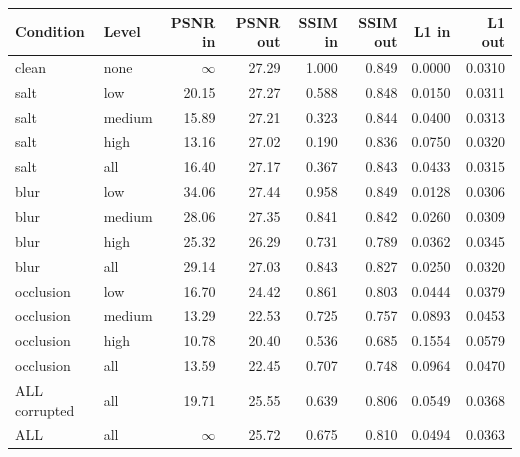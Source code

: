 \begin{tabular}{llrrrrrr}
\hline
Condition & Level & PSNR in & PSNR out & SSIM in & SSIM out & L1 in & L1 out \\
\hline
clean & none & $\infty$ & 27.29 & 1.000 & 0.849 & 0.0000 & 0.0310 \\
salt & low & 20.15 & 27.27 & 0.588 & 0.848 & 0.0150 & 0.0311 \\
salt & medium & 15.89 & 27.21 & 0.323 & 0.844 & 0.0400 & 0.0313 \\
salt & high & 13.16 & 27.02 & 0.190 & 0.836 & 0.0750 & 0.0320 \\
salt & all & 16.40 & 27.17 & 0.367 & 0.843 & 0.0433 & 0.0315 \\
blur & low & 34.06 & 27.44 & 0.958 & 0.849 & 0.0128 & 0.0306 \\
blur & medium & 28.06 & 27.35 & 0.841 & 0.842 & 0.0260 & 0.0309 \\
blur & high & 25.32 & 26.29 & 0.731 & 0.789 & 0.0362 & 0.0345 \\
blur & all & 29.14 & 27.03 & 0.843 & 0.827 & 0.0250 & 0.0320 \\
occlusion & low & 16.70 & 24.42 & 0.861 & 0.803 & 0.0444 & 0.0379 \\
occlusion & medium & 13.29 & 22.53 & 0.725 & 0.757 & 0.0893 & 0.0453 \\
occlusion & high & 10.78 & 20.40 & 0.536 & 0.685 & 0.1554 & 0.0579 \\
occlusion & all & 13.59 & 22.45 & 0.707 & 0.748 & 0.0964 & 0.0470 \\
ALL corrupted & all & 19.71 & 25.55 & 0.639 & 0.806 & 0.0549 & 0.0368 \\
ALL & all & $\infty$ & 25.72 & 0.675 & 0.810 & 0.0494 & 0.0363 \\
\hline
\end{tabular}
